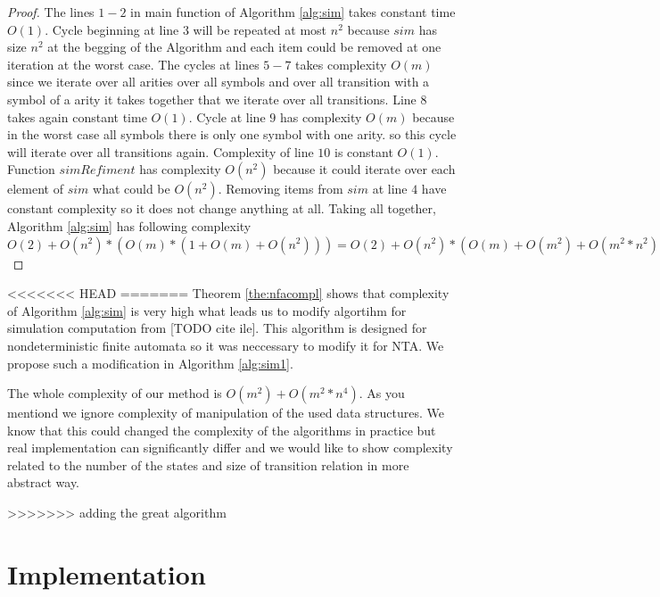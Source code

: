 \documentclass[a4paper, 12pt]{article}
\begin{document}
\begin{proof}
	The lines $1-2$ in main function of Algorithm \ref{alg:sim} takes constant time $O(1)$.
	Cycle beginning at line $3$ will be repeated at most $n^2$ because $sim$ has size $n^2$ at the begging of the Algorithm
	and each item could be removed at one iteration at the worst case.
	The cycles at lines $5-7$ takes complexity $O(m)$ since we iterate over all arities over all symbols and over all transition
	with a symbol of a arity it takes together that we iterate over all transitions.
	Line $8$ takes again constant time $O(1)$.
	Cycle at line $9$ has complexity $O(m)$ because in the worst case all symbols there is only one symbol with one arity.
	so this cycle will iterate over all transitions again.
	Complexity of line $10$ is constant $O(1)$.
	Function $simRefiment$ has complexity $O(n^2)$ because it could iterate over each element of $sim$ what could be $O(n^2)$.
	Removing items from $sim$ at line $4$ have constant complexity so it does not change anything at all.
	Taking all together, Algorithm \ref{alg:sim} has following complexity 
	$O(2) + O(n^2)*(O(m)*(1+O(m)+O(n^2)))=
	O(2) + O(n^2)*(O(m)+O(m^2)+O(m^2*n^2)) =
	O(n^2)*(O(m^2*n^2)) =
	O(m^2*n^4)$
\end{proof}

<<<<<<< HEAD
=======
Theorem \ref{the:nfacompl} shows that complexity of Algorithm \ref{alg:sim} is very high what leads us
to modify algortihm for simulation computation from [TODO cite ile].
This algorithm is designed for nondeterministic finite automata so it was neccessary to modify it for NTA.
We propose such a modification in Algorithm \ref{alg:sim1}.

\begin{algorithm}[h]
\label{alg:sim1}
	
	 \caption{Computing simulation on a NTA efficiently. Based on similiar algortihm for finite automata in \cite{ilie:nfa}.}
\end{algorithm}

The whole complexity of our method is $O(m^2)+O(m^2*n^4)$. As you mentiond we ignore complexity of
manipulation of the used data structures.
We know that this could changed the complexity of the algorithms in practice but real implementation can significantly differ
and we would like to show complexity related to the number of the states and size of transition relation in more abstract way.

>>>>>>> adding the great algorithm
\section{Implementation}
\label{sec:impl}
\end{document}
